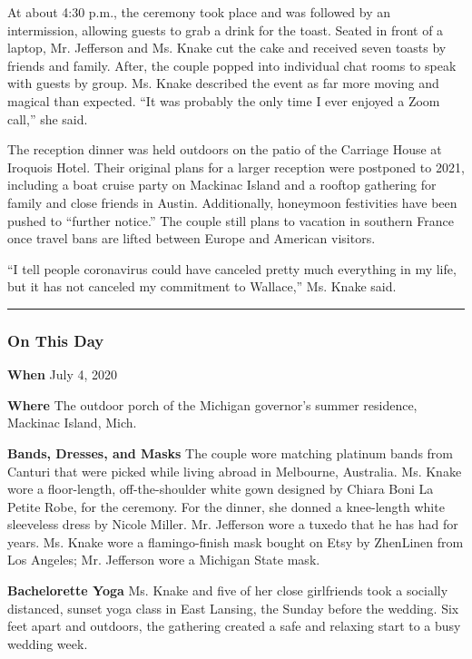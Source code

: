 At about 4:30 p.m., the ceremony took place and was followed by an
intermission, allowing guests to grab a drink for the toast. Seated in
front of a laptop, Mr. Jefferson and Ms. Knake cut the cake and received
seven toasts by friends and family. After, the couple popped into
individual chat rooms to speak with guests by group. Ms. Knake described
the event as far more moving and magical than expected. ``It was
probably the only time I ever enjoyed a Zoom call,'' she said.

The reception dinner was held outdoors on the patio of the Carriage
House at Iroquois Hotel. Their original plans for a larger reception
were postponed to 2021, including a boat cruise party on Mackinac Island
and a rooftop gathering for family and close friends in Austin.
Additionally, honeymoon festivities have been pushed to ``further
notice.'' The couple still plans to vacation in southern France once
travel bans are lifted between Europe and American visitors.

``I tell people coronavirus could have canceled pretty much everything
in my life, but it has not canceled my commitment to Wallace,'' Ms.
Knake said.

\begin{center}\rule{0.5\linewidth}{\linethickness}\end{center}

\hypertarget{on-this-day}{%
\subsubsection{\texorpdfstring{\textbf{On This
Day}}{On This Day}}\label{on-this-day}}

\textbf{When} July 4, 2020

\textbf{Where} The outdoor porch of the Michigan governor's summer
residence, Mackinac Island, Mich.

\textbf{Bands, Dresses, and Masks} The couple wore matching platinum
bands from Canturi that were picked while living abroad in Melbourne,
Australia. Ms. Knake wore a floor-length, off-the-shoulder white gown
designed by Chiara Boni La Petite Robe, for the ceremony. For the
dinner, she donned a knee-length white sleeveless dress by Nicole
Miller. Mr. Jefferson wore a tuxedo that he has had for years. Ms. Knake
wore a flamingo-finish mask bought on Etsy by ZhenLinen from Los
Angeles; Mr. Jefferson wore a Michigan State mask.

\textbf{Bachelorette Yoga} Ms. Knake and five of her close girlfriends
took a socially distanced, sunset yoga class in East Lansing, the Sunday
before the wedding. Six feet apart and outdoors, the gathering created a
safe and relaxing start to a busy wedding week.

